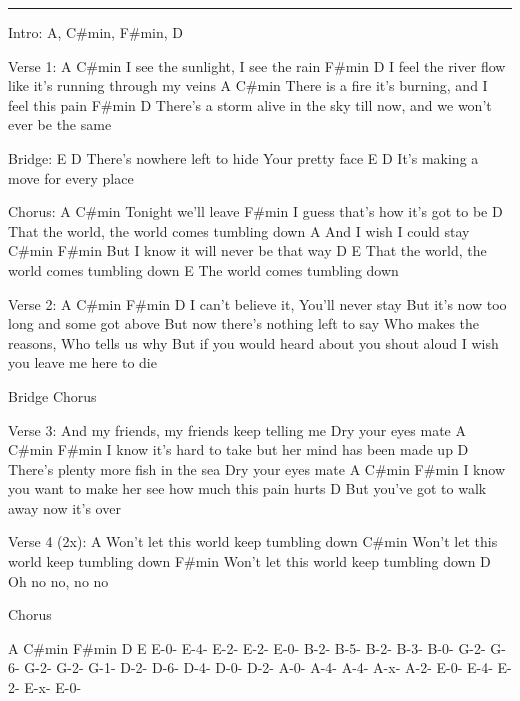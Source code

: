\noindent\rule{\columnwidth}{1pt}
\begin{lstsong}
Intro: A, C#min, F#min, D

Verse 1:
A                   C#min
I see the sunlight, I see the rain
F#min                           D
I feel the river flow like it's running through my veins
A                             C#min
There is a fire it's burning, and I feel this pain
F#min                                      D
There's a storm alive in the sky till now, and we won't ever be the same

Bridge:
E                             D
There's nowhere left to hide  Your pretty face
E                       D
It's making a move for every place

Chorus:
A                  C#min
Tonight we'll leave
                F#min
I guess that's how it's got to be
           D
That the world, the world comes tumbling down
A
And I wish I could stay
C#min                F#min
But I know it will never be that way
D                                          E
That the world, the world comes tumbling down
                         E
The world comes tumbling down

Verse 2: A C#min F#min D
I can't believe it, You'll never stay
But it's now too long and some got above
But now there's nothing left to say
Who makes the reasons, Who tells us why
But if you would heard about you shout aloud
I wish you leave me here to die

Bridge
Chorus
 
Verse 3:
And my friends, my friends keep telling me
Dry your eyes mate
A                                C#min                F#min
I know it's hard to take but her mind has been made up
D
There's plenty more fish in the sea
Dry your eyes mate
A                                C#min                F#min
I know you want to make her see how much this pain hurts
                      D
But you've got to walk away now it's over

Verse 4 (2x):
A
Won't let this world keep tumbling down
C#min
Won't let this world keep tumbling down
F#min
Won't let this world keep tumbling down
D
Oh no no, no no

Chorus


A       C#min    F#min    D        E
E-0-    E-4-     E-2-     E-2-     E-0-
B-2-    B-5-     B-2-     B-3-     B-0-
G-2-    G-6-     G-2-     G-2-     G-1-
D-2-    D-6-     D-4-     D-0-     D-2-
A-0-    A-4-     A-4-     A-x-     A-2-
E-0-    E-4-     E-2-     E-x-     E-0-

\end{lstsong}
\newpage
